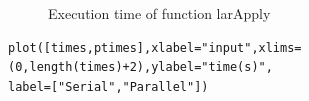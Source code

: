 \documentclass[a4paper,12pt]{article}
\begin{document}
\begin{figure}[!h]
\centering
{}
\caption{Execution time of function larApply}
\end{figure}
\vspace{25px}
\noindent {}
\begin{Verbatim}[fontsize=\footnotesize]
plot([times,ptimes],xlabel="input",xlims=(0,length(times)+2),ylabel="time(s)",
label=["Serial","Parallel"])
\end{Verbatim}
\end{document}
